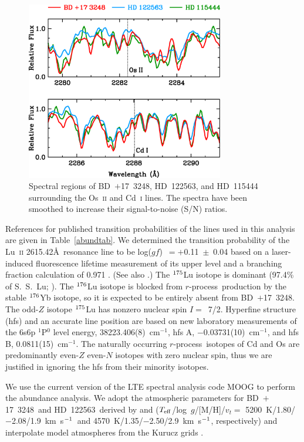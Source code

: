 \documentclass{emulateapj}
\newcommand\iso[2]{$^{\rm #1}$#2}
\def\bd{\mbox{BD~$+$17~3248}}
\def\hd{\mbox{HD~122563}}
\def\kmsec{\mbox{km~s$^{\rm -1}$}}
\def\rpro{\mbox{$r$-process}}
\begin{document}
\begin{figure}
\begin{center}
\includegraphics[angle=0,width=3.4in]{f1.eps}
\end{center}
\caption{
\label{overplot}
Spectral regions of \bd, \hd, and \mbox{HD~115444} 
surrounding the Os~\textsc{ii} and Cd~\textsc{i} lines.
The spectra have been smoothed to increase their signal-to-noise 
(S/N) ratios.
}
\end{figure}

References for published transition probabilities of the lines
used in this analysis are given in Table~\ref{abundtab}.
We determined the transition probability of the 
Lu~\textsc{ii} 2615.42\AA\
resonance line to be log($gf$)~$ = +$0.11~$\pm$~0.04 based on a
laser-induced fluorescence lifetime measurement of its upper level
\citep{fedchak00} and a branching fraction calculation of 0.971
\citep{quinet99}.  
(See also \citealt{lawler09}.)
The \iso{175}{Lu} isotope is dominant (97.4\% of S.~S.\ Lu;
\citealt{lodders03}). 
The \iso{176}{Lu} isotope is blocked from \rpro\ 
production by the stable \iso{176}{Yb} isotope, so it is
expected to be entirely absent from \bd. 
The odd-$Z$ isotope \iso{175}{Lu} has nonzero nuclear spin $I =$~7/2.
Hyperfine structure (hfs) and an accurate line position are based on
new laboratory measurements of the 6s6p $^{1}$P$^{0}$ 
level energy, 38223.406(8)~cm$^{-1}$, 
hfs A, $-$0.03731(10)~cm$^{-1}$, and 
hfs B, 0.0811(15)~cm$^{-1}$.
The naturally occurring \rpro\ isotopes of Cd and Os are predominantly
even-$Z$ even-$N$ isotopes with zero nuclear spin,
thus we are justified in ignoring the hfs from their
minority isotopes.

We use the current version of the LTE spectral analysis code MOOG
\citep{sneden73} to perform the abundance analysis.
We adopt the atmospheric parameters for \bd\ and \hd\ derived by
\citet{cowan02} and \citet{simmerer04}
($T_{\rm eff}$/log~$g$/[M/H]/$v_{t} =$ 
5200~K/1.80/$-$2.08/1.9~\kmsec\ and 
4570~K/1.35/$-$2.50/2.9~\kmsec, respectively)
and interpolate model atmospheres from the Kurucz grids
\citep{castelli97}.
\end{document}
